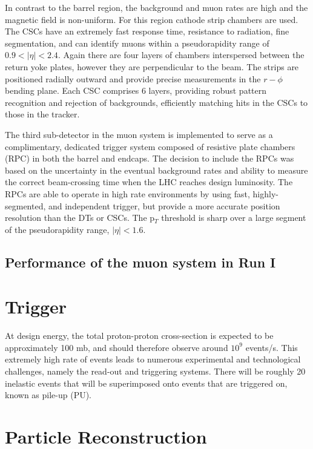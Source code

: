 In contrast to the barrel region, the background and muon rates are high and the magnetic field is non-uniform. For this region cathode strip chambers are used. The CSCs have an extremely fast response time, resistance to radiation, fine segmentation, and can identify muons within a pseudorapidity range of $0.9 < |\eta| < 2.4$. Again there are four layers of chambers interspersed between the return yoke plates, however they are perpendicular to the beam. The strips are positioned radially outward and provide precise measurements in the $r-\phi$ bending plane. Each CSC comprises 6 layers, providing robust pattern recognition and rejection of backgrounds, efficiently matching hits in the CSCs to those in the tracker.

The third sub-detector in the muon system is implemented to serve as a complimentary, dedicated trigger system composed of resistive plate chambers (RPC) in both the barrel and endcaps. The decision to include the RPCs was based on the uncertainty in the eventual background rates and ability to measure the correct beam-crossing time when the LHC reaches design luminosity. The RPCs are able to operate in high rate environments by using fast, highly-segmented, and independent trigger, but provide a more accurate position resolution than the DTs or CSCs. The p$_T$ threshold is sharp over a large segment of the pseudorapidity range, $|\eta|<1.6$. 

\subsection{Performance of the muon system in Run I} \label{subsec-MuonSystemPerformance}



\section{Trigger} \label{sec-Trigger}

At design energy, the total proton-proton cross-section is expected to be approximately 100 mb, and should therefore observe around $10^9$ events/s. This extremely high rate of events leads to numerous experimental and technological challenges, namely the read-out and triggering systems. There will be roughly 20 inelastic events that will be superimposed onto events that are triggered on, known as pile-up (PU). 

\section{Particle Reconstruction} \label{sec-ParticleReconstruction}

